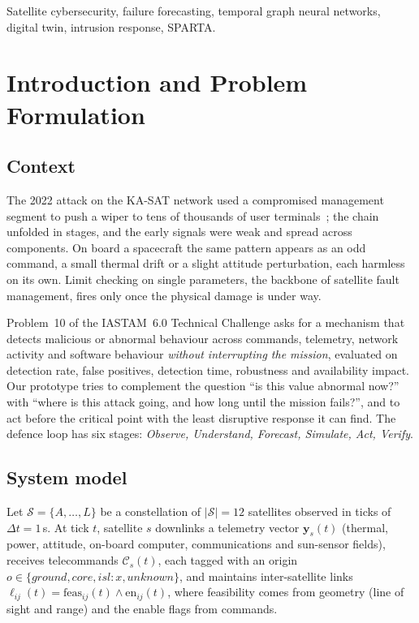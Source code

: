 \documentclass[conference]{IEEEtran}
\begin{document}
\begin{IEEEkeywords}
Satellite cybersecurity, failure forecasting, temporal graph neural networks, digital twin,
intrusion response, SPARTA.
\end{IEEEkeywords}

\section{Introduction and Problem Formulation}
\label{sec:intro}

\subsection{Context}
The 2022 attack on the KA-SAT network used a compromised management segment to push a wiper to tens of
thousands of user terminals~\cite{viasat2022,acidrain2022}; the chain unfolded in stages, and the
early signals were weak and spread across components. On board a spacecraft the same pattern appears
as an odd command, a small thermal drift or a slight attitude perturbation, each harmless on its own.
Limit checking on single parameters, the backbone of satellite fault management, fires only once the
physical damage is under way.

Problem~10 of the IASTAM~6.0 Technical Challenge asks for a mechanism that detects malicious or
abnormal behaviour across commands, telemetry, network activity and software behaviour \emph{without
interrupting the mission}, evaluated on detection rate, false positives, detection time, robustness and
availability impact. Our prototype tries to complement the question ``is this value abnormal now?''
with ``where is this attack going, and how long until the mission fails?'', and to act before the
critical point with the least disruptive response it can find. The defence loop has six stages: \emph{Observe, Understand, Forecast,
Simulate, Act, Verify}.

\subsection{System model}
Let $\mathcal{S}=\{A,\dots,L\}$ be a constellation of $|\mathcal{S}|=12$ satellites observed in ticks
of $\Delta t = 1$\,s. At tick $t$, satellite $s$ downlinks a telemetry vector $\mathbf{y}_s(t)$
(thermal, power, attitude, on-board computer, communications and sun-sensor fields), receives
telecommands $\mathcal{C}_s(t)$, each tagged with an origin $o \in \{\textit{ground},
\textit{core}, \textit{isl}{:}x, \textit{unknown}\}$, and maintains inter-satellite links
$\ell_{ij}(t) = \mathrm{feas}_{ij}(t) \wedge \mathrm{en}_{ij}(t)$, where feasibility comes from
geometry (line of sight and range) and the enable flags from commands.
\end{document}
